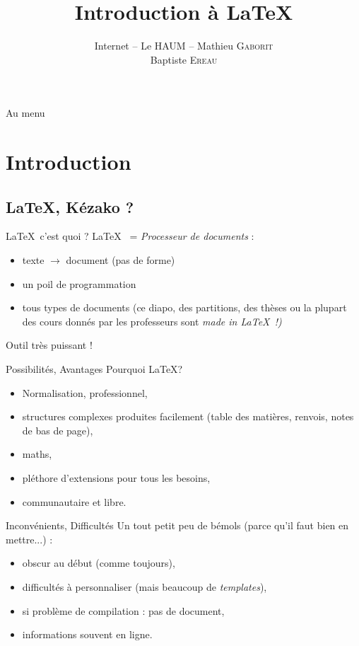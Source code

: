 \documentclass[1pt]{beamer}
\title{Introduction à \LaTeX{}}
\author[]{Internet -- Le \textsc{HAUM} \inst{1} -- Mathieu \textsc{Gaborit} \inst{1,}\inst{2} \\Baptiste \textsc{Ereau} \inst{1,}\inst{2}}
\institute[]
{
	\inst{1}%
	Hackerspace AU Mans ~~\url{http://www.haum.org}
		\and
	\inst{2}%
	Université du Maine
}
\date{}
\begin{document}
\begin{frame}
	\titlepage
\end{frame}


\begin{frame}{Au menu}
	\tableofcontents
\end{frame}

\section{Introduction}
\subsection{\LaTeX, Kézako ?}

\begin{frame}{\LaTeX ~c'est quoi ?}
	\LaTeX~ = {\em Processeur de documents} :

	\begin{itemize}
	\item texte $\rightarrow$ document (pas de forme)
	\item un poil de programmation
	\item tous types de documents (ce diapo, des partitions, des thèses ou la plupart des cours donnés par les professeurs sont \em{made in }\LaTeX ~!)
	\end{itemize}
	
	\begin{block}{}
	\centering
	Outil très puissant !
	\end{block}
	
\end{frame}

\begin{frame}{Possibilités, Avantages}
Pourquoi \LaTeX ?
\begin{itemize}
\item Normalisation, professionnel,
\item structures complexes produites facilement (table des matières, renvois, notes de bas de page),
\item maths,
\item pléthore d'extensions pour tous les besoins,
\item communautaire et libre.
\end{itemize}
\end{frame}

\begin{frame}{Inconvénients, Difficultés}
Un tout petit peu de bémols (parce qu'il faut bien en mettre...) :
\begin{itemize}
\item obscur au début (comme toujours),
\item difficultés à personnaliser (mais beaucoup de \textit{templates}),
\item si problème de compilation : pas de document,
\item informations souvent en ligne.
\end{itemize}
\end{frame}
\end{document}
